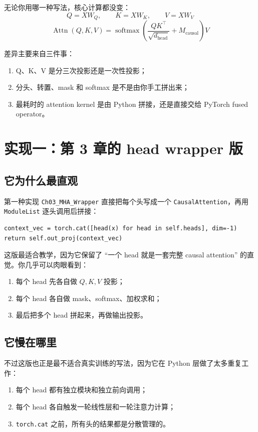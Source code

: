 \documentclass[12pt,a4paper]{ctexart}
\newcommand{\code}[1]{\texttt{#1}}
\begin{document}
无论你用哪一种写法，核心计算都没变：
\[
Q = XW_Q,\qquad K = XW_K,\qquad V = XW_V
\]
\[
\operatorname{Attn}(Q,K,V)
=
\operatorname{softmax}\!\left(
\frac{QK^\top}{\sqrt{d_{\text{head}}}} + M_{\text{causal}}
\right)V
\]

差异主要来自三件事：

\begin{enumerate}
  \item Q、K、V 是分三次投影还是一次性投影；
  \item 分头、转置、mask 和 softmax 是不是由你手工拼出来；
  \item 最耗时的 attention kernel 是由 Python 拼接，还是直接交给 PyTorch fused operator。
\end{enumerate}

\section{实现一：第 3 章的 head wrapper 版}

\subsection{它为什么最直观}

第一种实现 \code{Ch03\_MHA\_Wrapper} 直接把每个头写成一个
\code{CausalAttention}，再用 \code{ModuleList} 逐头调用后拼接：

\begin{lstlisting}[style=py]
context_vec = torch.cat([head(x) for head in self.heads], dim=-1)
return self.out_proj(context_vec)
\end{lstlisting}

这版最适合教学，因为它保留了 ``一个 head 就是一套完整 causal attention''
的直觉。你几乎可以肉眼看到：

\begin{enumerate}
  \item 每个 head 先各自做 \(Q,K,V\) 投影；
  \item 每个 head 各自做 mask、softmax、加权求和；
  \item 最后把多个 head 拼起来，再做输出投影。
\end{enumerate}

\subsection{它慢在哪里}

不过这版也正是最不适合真实训练的写法，因为它在 Python 层做了太多重复工作：

\begin{enumerate}
  \item 每个 head 都有独立模块和独立前向调用；
  \item 每个 head 各自触发一轮线性层和一轮注意力计算；
  \item \code{torch.cat} 之前，所有头的结果都是分散管理的。
\end{enumerate}
\end{document}
